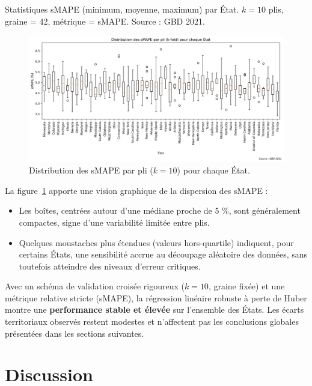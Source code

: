 \newpage
\begin{table}[H]
	\centering
	\caption{Statistiques sMAPE (minimum, moyenne, maximum) par État.
		$k = 10$ plis, graine = 42, métrique = sMAPE.
		Source : GBD 2021.}
	\label{tab:smape-states}
	\scalebox{0.85}{}
\end{table}
\newpage

\begin{figure}[H]
	\centering
	\includegraphics[width=1\textwidth]{images/boxplot_smape_etats.png}
	\caption{Distribution des sMAPE par pli ($k=10$) pour chaque État.}
	\label{fig:smape-boxplot}
\end{figure}

La figure~\ref{fig:smape-boxplot} apporte une vision graphique de la dispersion
des sMAPE :

\begin{itemize}
	\item Les boîtes, centrées autour d’une médiane proche de 5 \%, sont
	généralement compactes, signe d’une variabilité limitée entre plis.  
	\item Quelques moustaches plus étendues (valeurs hors-quartile) indiquent,
	pour certains États, une sensibilité accrue au découpage aléatoire des
	données, sans toutefois atteindre des niveaux d’erreur critiques.  
\end{itemize}

Avec un schéma de validation croisée rigoureux ($k=10$, graine fixée) et une
métrique relative stricte (sMAPE), la régression linéaire robuste à perte de
Huber montre une \textbf{performance stable et élevée} sur l’ensemble des
États.  Les écarts territoriaux observés restent modestes et n'affectent pas
les conclusions globales présentées dans les sections suivantes.

\section{Discussion}

